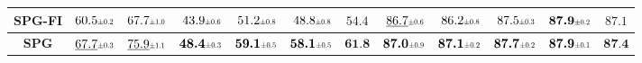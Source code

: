 \begin{table}[t]
{\begin{tabular}{crrrrrcrrrrc}
SPG-FI &
$60.5\std{0.2}$ & $67.7\std{1.0}$ & 
$43.9\std{0.6}$ & $51.2\std{0.8}$ & 
$48.8\std{0.8}$ & 
$54.4$ &
$\underline{86.7}\std{0.6}$ & $86.2\std{0.8}$ & 
$87.5\std{0.3}$ & $\textbf{87.9}\std{0.2}$ & 
$87.1$ \\


\midrule


\textbf{SPG} &
$\underline{67.7}\std{0.3}$ & $\underline{75.9}\std{1.1}$ & 
$\textbf{48.4}\std{0.3}$ & $\textbf{59.1}\std{0.5}$ & 
$\textbf{58.1}\std{0.5}$ & 
$\textbf{61.8}$ &
$\textbf{87.0}\std{0.9}$ & $\textbf{87.1}\std{0.2}$ & 
$\textbf{87.7}\std{0.2}$ & $\textbf{87.9}\std{0.1}$ & 
$\textbf{87.4}$ \\


\bottomrule
\end{tabular}
}
\vspace{-3mm}
\end{table}
